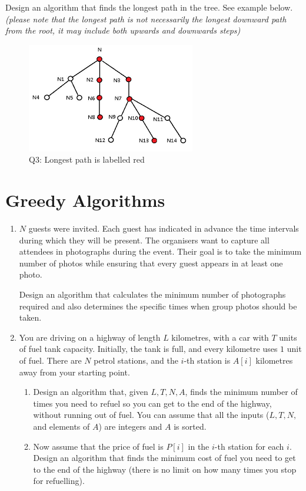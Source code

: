 \documentclass{article}
\begin{document}
\begin{enumerate}
    Design an algorithm that finds the longest path in the tree. See example below.\\ \emph{(please note that the longest path is not necessarily the longest downward path from the root, it may include both upwards and downwards steps)}
    \begin{figure}[h]
        \centering
        \includegraphics[width=0.32\linewidth]{longest-path.png}
        \caption{Q3: Longest path is labelled red}
        \label{fig:enter-label}
    \end{figure}
\end{enumerate}

\section{Greedy Algorithms}

\begin{enumerate}
    \item $N$ guests were invited. Each guest has indicated in advance the time intervals during which they will be present. The organisers want to capture all attendees in photographs during the event. Their goal is to take the minimum number of photos while ensuring that every guest appears in at least one photo.

    Design an algorithm that calculates the minimum number of photographs required and also determines the specific times when group photos should be taken.
    \item You are driving on a highway of length $L$ kilometres, with a car with  $T$ units of fuel tank capacity. Initially, the tank is full, and every kilometre uses $1$ unit of fuel. There are $N$ petrol stations, and the $i$-th station is $A[i]$ kilometres away from your starting point.
    \begin{enumerate} 
        \item Design an algorithm that, given $L, T, N, A$, finds the minimum number of times you need to refuel so you can get to the end of the highway, without running out of fuel. You can assume that all the inputs ($L,T, N,$ and elements of $A$) are integers and $A$ is sorted.
        \item Now assume that the price of fuel is $P[i]$ in the $i$-th station for each $i$. Design an algorithm that finds the minimum cost of fuel you need to get to the end of the highway (there is no limit on how many times you stop for refuelling).
    \end{enumerate}
\end{enumerate}
\end{document}
